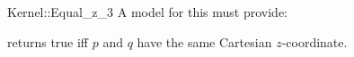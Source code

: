 \begin{ccRefFunctionObjectConcept}{Kernel::Equal_z_3}
A model for this must provide:


{returns true iff $p$ and $q$ have the same Cartesian $z$-coordinate.}

\end{ccRefFunctionObjectConcept}
